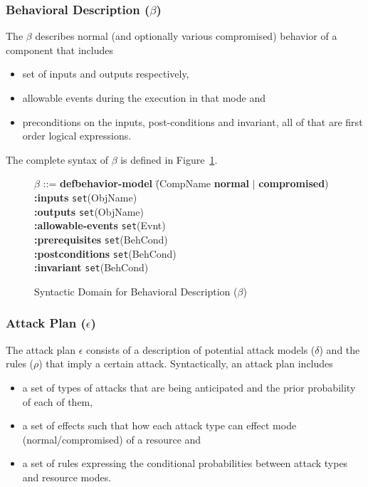 \documentclass[conference]{IEEEtran}
\begin{document}
\subsubsection*{Behavioral Description ($\beta$)}
The $\beta$ describes normal (and optionally various compromised) behavior of a component that includes
\begin{itemize}
\item  set of inputs and outputs respectively,
\item  allowable events during the execution in that mode and
\item  preconditions on the inputs, post-conditions and invariant, all of that are first order logical expressions.
\end{itemize}
The complete syntax of $\beta$ is defined in Figure~\ref{fig:behave}.
\begin{figure}
\begin{tabbing}
$\beta$ ::= \textbf{defbehavior-model} \=(CompName \textbf{normal} $|$ \textbf{compromised})
\\\> \textbf{:inputs} \hspace*{1.5cm} \texttt{set}(ObjName)
\\\> \textbf{:outputs} \hspace*{1.3cm} \texttt{set}(ObjName)
\\\> \textbf{:allowable-events}  \hspace*{0.1cm} \texttt{set}(Evnt)
\\\> \textbf{:prerequisites} \hspace*{0.6cm} \texttt{set}(BehCond)
\\\> \textbf{:postconditions} \hspace*{0.4cm} \texttt{set}(BehCond)
\\\> \textbf{:invariant} \hspace*{1.1cm} \texttt{set}(BehCond)
\end{tabbing}
\caption{Syntactic Domain for Behavioral Description ($\beta$)}
\label{fig:behave}
\end{figure}

\subsubsection*{Attack Plan ($\epsilon$)}
The attack plan $\epsilon$ consists of a description of potential attack models ($\delta$) and the rules ($\rho$) that imply a certain attack.  Syntactically, an attack plan includes
\begin{itemize}
\item a set of types of attacks that are being anticipated and the prior probability of each of them,
\item a set of effects such that how each attack type can effect mode (normal/compromised) of a resource and
\item a set of rules expressing the conditional probabilities between attack types and resource modes.
\end{itemize}
\end{document}
